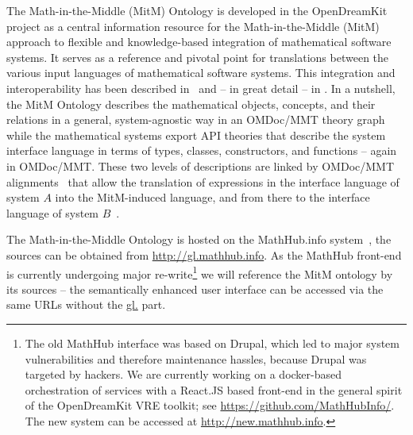 The Math-in-the-Middle (MitM) Ontology is developed in the OpenDreamKit project as a
central information resource for the Math-in-the-Middle (MitM) approach to flexible and
knowledge-based integration of mathematical software systems. It serves as a reference and
pivotal point for translations between the various input languages of mathematical
software systems. This integration and interoperability has been described
in~\cite{DehKohKon:iop16,WieKohRab:vtuimkb17,KohMuePfe:kbimss17} and -- in great detail --
in \cite{ODK-D6.5}. In a nutshell, the MitM Ontology describes the mathematical objects,
concepts, and their relations in a general, system-agnostic way in an OMDoc/MMT theory
graph while the mathematical systems export API theories that describe the system
interface language in terms of types, classes, constructors, and functions -- again in
OMDoc/MMT. These two levels of descriptions are linked by OMDoc/MMT
alignments~\cite{MueGauKal:cacfms17} that allow the translation of expressions in the
interface language of system $A$ into the MitM-induced language, and from there to the
interface language of system $B$~\cite{MueRoYuRa:abtafs17}.

The Math-in-the-Middle Ontology is hosted on the MathHub.info system~\cite{IanJucKoh:sdm14,MathHub:on}, the sources can be obtained from \url{http://gl.mathhub.info}.
As the MathHub front-end is currently undergoing major re-write\footnote{The old MathHub interface was based on Drupal, which led to major system vulnerabilities and therefore maintenance hassles, because Drupal was targeted by hackers.
  We are currently working on a docker-based orchestration of services with a React.JS based front-end in the general spirit of the OpenDreamKit VRE toolkit; see \url{https://github.com/MathHubInfo/}.
  The new system can be accessed at \url{http://new.mathhub.info}.} we will reference the MitM ontology by its sources -- the semantically enhanced user interface can be accessed via the same URLs without the \url{gl.} part.

